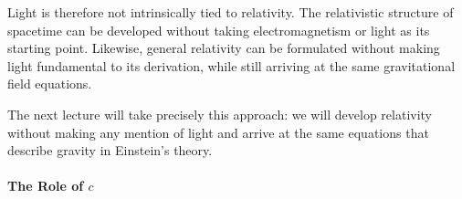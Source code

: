 		Light is therefore not intrinsically tied to relativity. The relativistic
		structure of spacetime can be developed without taking electromagnetism or
		light as its starting point. Likewise, general relativity can be formulated
		without making light fundamental to its derivation, while still arriving at
		the same gravitational field equations.

		The next lecture will take precisely this approach: we will develop 
		relativity without making any mention of light and arrive at
		the same equations that describe gravity in Einstein's theory.
	\paragraph{The Role of $c$}





